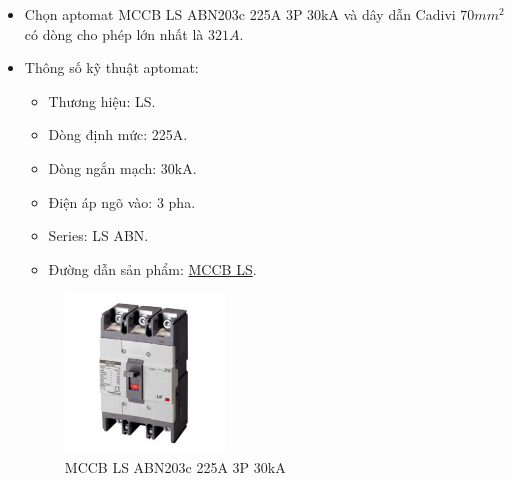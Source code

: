                 \begin{itemize}
                    \item Chọn aptomat MCCB LS ABN203c 225A 3P 30kA và dây dẫn Cadivi $70mm^2$ có dòng cho phép lớn nhất là $321A$.
                    \item Thông số kỹ thuật aptomat:
                        \begin{itemize}
                            \item Thương hiệu: LS.
                            \item Dòng định mức: 225A.
                            \item Dòng ngắn mạch: 30kA.
                            \item Điện áp ngõ vào: 3 pha.
                            \item Series: LS ABN.
                            \item Đường dẫn sản phẩm: \href{https://codienhaiau.com/product/mccb-ls-abn203c-225a-30ka-3p/}{MCCB LS}.
                        \end{itemize}
                        \begin{figure}[H]
                            \centering
                            \includegraphics[width=0.4\textwidth]{pictures/2n.png}
                            \caption{MCCB LS ABN203c 225A 3P 30kA}
                        \end{figure}
                \end{itemize}
                
                
    
                
            
            